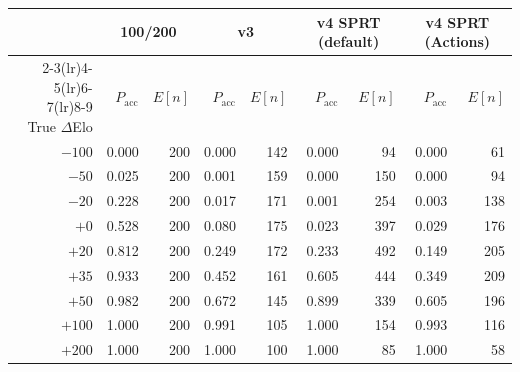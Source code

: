 \begin{tabular}{r rr rr rr rr}
\toprule
 & \multicolumn{2}{c}{\katago{} 100/200} & \multicolumn{2}{c}{\gofer{} v3} & \multicolumn{2}{c}{v4 SPRT (default)} & \multicolumn{2}{c}{v4 SPRT (Actions)} \\
\cmidrule(lr){2-3}\cmidrule(lr){4-5}\cmidrule(lr){6-7}\cmidrule(lr){8-9}
True $\Delta$Elo & $P_{\mathrm{acc}}$ & $E[n]$ & $P_{\mathrm{acc}}$ & $E[n]$ & $P_{\mathrm{acc}}$ & $E[n]$ & $P_{\mathrm{acc}}$ & $E[n]$ \\
\midrule
$-100$ & 0.000 & 200 & 0.000 & 142 & 0.000 & 94 & 0.000 & 61 \\
$-50$ & 0.025 & 200 & 0.001 & 159 & 0.000 & 150 & 0.000 & 94 \\
$-20$ & 0.228 & 200 & 0.017 & 171 & 0.001 & 254 & 0.003 & 138 \\
$+0$ & 0.528 & 200 & 0.080 & 175 & 0.023 & 397 & 0.029 & 176 \\
$+20$ & 0.812 & 200 & 0.249 & 172 & 0.233 & 492 & 0.149 & 205 \\
$+35$ & 0.933 & 200 & 0.452 & 161 & 0.605 & 444 & 0.349 & 209 \\
$+50$ & 0.982 & 200 & 0.672 & 145 & 0.899 & 339 & 0.605 & 196 \\
$+100$ & 1.000 & 200 & 0.991 & 105 & 1.000 & 154 & 0.993 & 116 \\
$+200$ & 1.000 & 200 & 1.000 & 100 & 1.000 & 85 & 1.000 & 58 \\
\bottomrule
\end{tabular}
